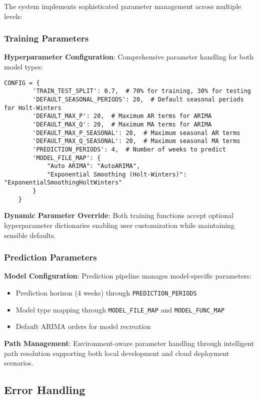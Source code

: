 The system implements sophisticated parameter management across multiple levels:

\subsubsection{Training Parameters}

\textbf{Hyperparameter Configuration}: Comprehensive parameter handling for both model types:

\begin{lstlisting}[language=MyPython, caption={Configuration Parameters}]
	CONFIG = {
		'TRAIN_TEST_SPLIT': 0.7,  # 70% for training, 30% for testing
		'DEFAULT_SEASONAL_PERIODS': 20,  # Default seasonal periods for Holt-Winters
		'DEFAULT_MAX_P': 20,  # Maximum AR terms for ARIMA
		'DEFAULT_MAX_Q': 20,  # Maximum MA terms for ARIMA
		'DEFAULT_MAX_P_SEASONAL': 20,  # Maximum seasonal AR terms
		'DEFAULT_MAX_Q_SEASONAL': 20,  # Maximum seasonal MA terms
		'PREDICTION_PERIODS': 4,  # Number of weeks to predict
		'MODEL_FILE_MAP': {
			"Auto ARIMA": "AutoARIMA",
			"Exponential Smoothing (Holt-Winters)": "ExponentialSmoothingHoltWinters"
		}
	}
\end{lstlisting}

\textbf{Dynamic Parameter Override}: Both training functions accept optional hyperparameter dictionaries enabling user customization while maintaining sensible defaults.

\subsubsection{Prediction Parameters}

\textbf{Model Configuration}: Prediction pipeline manages model-specific parameters:
\begin{itemize}
	\item Prediction horizon (4 weeks) through \texttt{PREDICTION\_PERIODS}
	\item Model type mapping through \texttt{MODEL\_FILE\_MAP} and \texttt{MODEL\_FUNC\_MAP}
	\item Default ARIMA orders for model recreation
\end{itemize}

\textbf{Path Management}: Environment-aware parameter handling through intelligent path resolution supporting both local development and cloud deployment scenarios.

\subsection{Error Handling}

